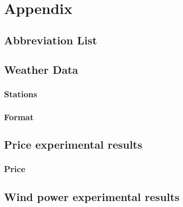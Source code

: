 \documentclass[twoside,11pt,openright]{report}
\begin{document}

 



\chapter{Appendix}
\label{ch:appendix}
\section{Abbreviation List}
\label{sec:abbreviationList}

\newpage
\section{Weather Data}
\subsection{Stations}
\label{sec:weatherStations}

\subsection{Format} 
\label{sec:weatherDataFormat}
 
\section{Price experimental results}
\subsection{Price}
\label{sec:priceResultAppendix}
 
\section{Wind power experimental results}
\label{sec:windResultsAppendix}
 	
\end{document}
